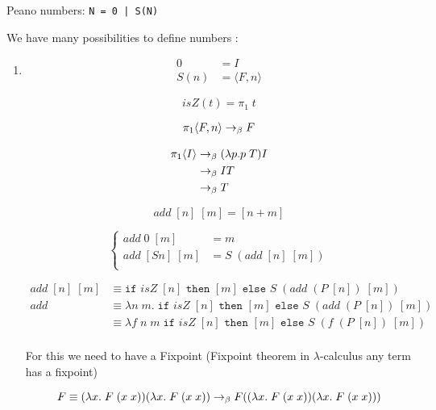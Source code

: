   Peano numbers:
  \texttt{N = 0 | S(N) }

  We have many possibilities to define numbers :

  \begin{enumerate}
    \item
      \begin{align*}
        0 &= I \\
        S(n) &= \langle F, n \rangle
      \end{align*}

      $$isZ(t) = \pi_1\;t $$

      \begin{multicols}{2}
        \begin{align*}
          \pi_1 \langle F, n \rangle \to_\beta F
        \end{align*}

        \begin{align*}
          \pi_1 \langle I \rangle &\to_\beta (\lambda p.p\;T) I \\
          &\to_\beta I T \\
          &\to_\beta T
        \end{align*}
      \end{multicols}

      $$add\;[n]\;[m] = [n + m]$$

      \[
        \begin{cases}
          add\;0\;[m] &= m \\
          add\;[S n]\;[m] &= S\;(add\;[n]\;[m]) \\
        \end{cases}
      \]

      \begin{align*}
        add\;[n]\;[m] &\equiv \texttt{if } isZ\;[n] \texttt{ then } [m]
                           \texttt{ else } S\; (add\;(P\;[n])\;[m]) \\
        add &\equiv \lambda n\; m.\; \texttt{if } isZ\;[n] \texttt{ then } [m]
                           \texttt{ else } S\; (add\;(P\;[n])\;[m]) \\
            &\equiv \lambda f\;n\;m\; \texttt{if } isZ\;[n] \texttt{ then } [m]
                           \texttt{ else } S\; (f\;(P\;[n])\;[m]) \\
      \end{align*}

      For this we need to have a Fixpoint (Fixpoint theorem in
      $\lambda$-calculus any term has a fixpoint)

      $$F \equiv (\lambda x.\;F\;(x\;x)) (\lambda x.\; F\;(x\;x)) \to_\beta 
          F ((\lambda x.\;F\;(x\;x)) (\lambda x.\; F\;(x\;x)))$$


\end{enumerate}
